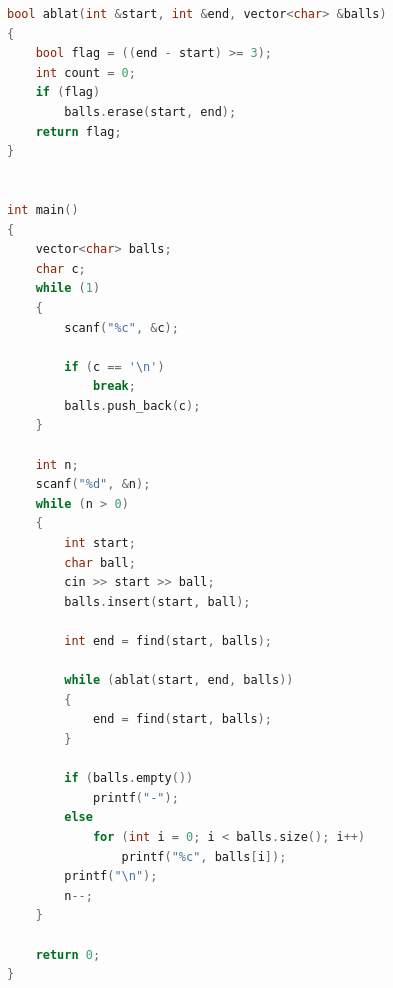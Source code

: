 \documentclass[UTF8]{ctexart}
\begin{document}
\begin{lstlisting}[language=C++,caption={vector版祖玛代码},label={vec_code}]
bool ablat(int &start, int &end, vector<char> &balls)
{
    bool flag = ((end - start) >= 3);
    int count = 0;
    if (flag)
        balls.erase(start, end);
    return flag;
}


int main()
{
    vector<char> balls;
    char c;
    while (1)
    {
        scanf("%c", &c);

        if (c == '\n')
            break;
        balls.push_back(c);
    }

    int n;
    scanf("%d", &n);
    while (n > 0)
    {
        int start;
        char ball;
        cin >> start >> ball;
        balls.insert(start, ball);

        int end = find(start, balls);
        
        while (ablat(start, end, balls))
        {
            end = find(start, balls);
        }

        if (balls.empty())
            printf("-");
        else
            for (int i = 0; i < balls.size(); i++)
                printf("%c", balls[i]);
        printf("\n");
        n--;
    }

    return 0;
}
	\end{lstlisting}
\end{document}
